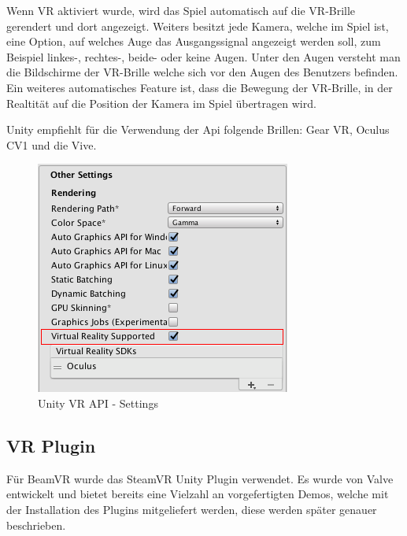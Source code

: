 Wenn VR aktiviert wurde, wird das Spiel automatisch auf die VR-Brille gerendert und dort angezeigt.
Weiters besitzt jede Kamera, welche im Spiel ist, eine Option, auf welches Auge das Ausgangssignal angezeigt werden soll, zum Beispiel linkes-, rechtes-, beide- oder keine Augen.
Unter den Augen versteht man die Bildschirme der VR-Brille welche sich vor den Augen des Benutzers befinden.
Ein weiteres automatisches Feature ist, dass die Bewegung der VR-Brille, in der Realtität auf die Position der Kamera im Spiel übertragen wird.

Unity empfiehlt für die Verwendung der Api folgende Brillen: Gear VR, Oculus CV1 und die Vive.
~\cite{Unity_VR_Overview_2022}

\begin {figure}
    \centering
    \includegraphics[scale=0.8]{pics/unity_basis_vr_api_settings}
    \caption{Unity VR API - Settings}
    \label{fig:unity_vr_api_settings}
\end {figure}

\subsection{VR Plugin}
Für BeamVR wurde das SteamVR Unity Plugin verwendet.
Es wurde von Valve entwickelt und bietet bereits eine Vielzahl an vorgefertigten Demos, welche mit der Installation des Plugins mitgeliefert werden, diese werden später genauer beschrieben.
~\cite{SteamVR_Overview_2022}

